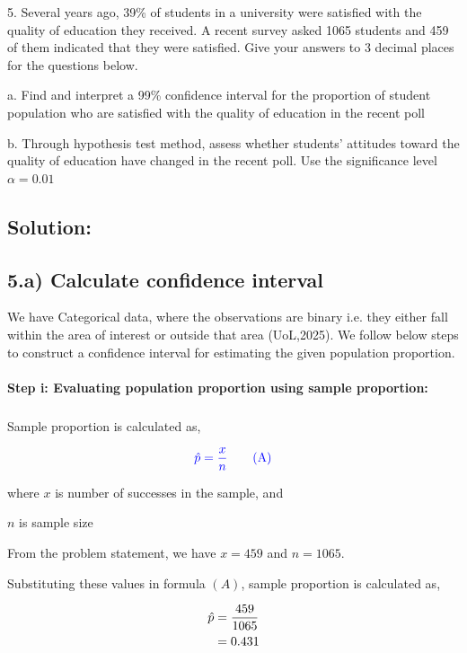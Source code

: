 \documentclass[a4paper]{report}
\begin{document}
5. Several years ago, 39\% of students in a university were satisfied with the quality of education they received. A recent survey asked 1065 students and 459 of them indicated that they were satisfied. Give your answers to 3 decimal places for the questions below.

a. Find and interpret a 99\% confidence interval for the proportion of student population who are satisfied with the quality of education in the recent poll      

b. Through hypothesis test method, assess whether students’ attitudes toward the quality of education have changed in the recent poll. Use the significance level $\alpha=0.01$

\subsection*{Solution:}

\subsection*{5.a) Calculate confidence interval}

We have Categorical data, where the observations are binary i.e. they either fall within the area of interest or outside that area (UoL,2025). We follow below steps to construct a confidence interval for estimating the given population proportion.


\paragraph{Step i: Evaluating population proportion using sample proportion:}

\subparagraph*{}



Sample proportion is calculated as,

\begin{equation*}
    \color{blue}\hat{p}=\frac{x}{n} \tag{A}
\end{equation*}

where $x$ is number of successes in the sample, and

$n$ is sample size

From the problem statement, we have $x=459$ and $n=1065$.

Substituting these values in formula $(A)$, sample proportion is calculated as,

\begin{align}
    \notag \hat{p}&=\frac{459}{1065} \\ &=0.431
\end{align}
\end{document}
